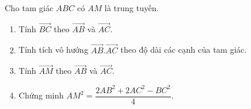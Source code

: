 \begin{vd}%
	Cho tam giác $ABC$ có $AM$ là trung tuyến.
	\begin{enumerate}
		\item Tính $\vec{BC}$ theo $\vec{AB}$ và $\vec{AC}$.
		\item Tính tích vô hướng $\vec{AB}.\vec{AC}$ theo độ dài các cạnh của tam giác.
		\item Tính $\vec{AM}$ theo $\vec{AB}$ và $\vec{AC}$.
		\item Chứng minh $AM^2=\dfrac{2AB^2+2AC^2-BC^2}{4}$.
	\end{enumerate}
\end{vd}

